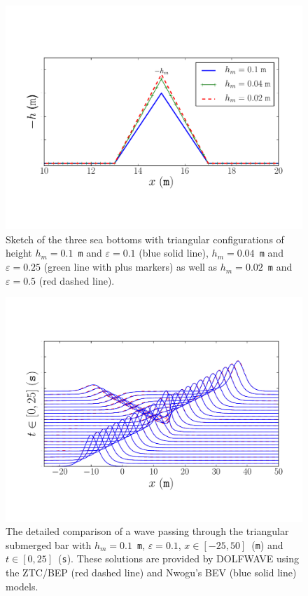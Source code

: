 \begin{figure}
  \begin{center}
    \includegraphics[width=\largefig]{chapters/lopes/pdf/deptheps.pdf}
  \end{center}
  \caption{Sketch of the three sea bottoms with triangular
    configurations of height $h_m=0.1$~{\tt m} and $\varepsilon=0.1$ (blue
    solid line), $h_m=0.04$~{\tt m} and $\varepsilon=0.25$ (green line
    with plus markers) as well as $h_m=0.02$~{\tt m} and $\varepsilon=0.5$
    (red dashed line).}
  \label{fig:lopes:spikes}
\end{figure}

\begin{figure}
  \begin{center}
    \includegraphics[width=\largefig]{chapters/lopes/pdf/epsilon0_1.pdf}
  \end{center}
\caption{The detailed comparison of a wave passing through the
  triangular submerged bar with $h_m=0.1$~{\tt m}, $\varepsilon=0.1$,
  $x\in[-25,50]$~({\tt m}) and $t\in[0,25]$~({\tt s}).  These solutions
  are provided by DOLFWAVE using the ZTC/BEP (red dashed line) and
  Nwogu's BEV (blue solid line) models.}
\label{fig:lopes:znspike01}
\end{figure}

